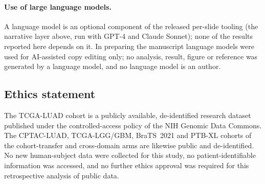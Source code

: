 \paragraph{Use of large language models.}
A language model is an optional component of the released per-slide
tooling (the narrative layer above, run with GPT-4 and Claude Sonnet);
none of the results reported here depends on it. In
preparing the manuscript language models were used for AI-assisted copy editing
only; no analysis, result, figure or reference was generated by a
language model, and no language model is an author.

\subsection*{Ethics statement}

The TCGA-LUAD cohort is a publicly available, de-identified
research dataset published under the controlled-access policy of
the NIH Genomic Data Commons.\cite{tcga2014luad}
The CPTAC-LUAD, TCGA-LGG/GBM, BraTS~2021 and PTB-XL cohorts of the
cohort-transfer and cross-domain arms are likewise public and
de-identified.
No new human-subject data were collected for this study, no
patient-identifiable information was accessed, and no further ethics
approval was required for this retrospective analysis of public data.

